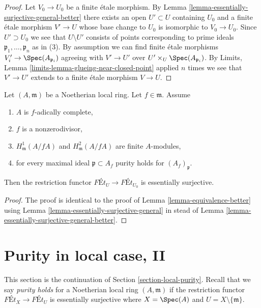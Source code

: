 \begin{proof}
Let $V_0 \to U_0$ be a finite \'etale morphism. By
Lemma \ref{lemma-essentially-surjective-general-better}
there exists an open $U' \subset U$ containing $U_0$ and
a finite \'etale morphism $V' \to U$ whose base change to $U_0$
is isomorphic to $V_0 \to U_0$. Since $U' \supset U_0$
we see that $U \setminus U'$ consists of points corresponding
to prime ideals $\mathfrak p_1, \ldots, \mathfrak p_n$ as in (3).
By assumption we can find finite \'etale morphisms
$V'_i \to \Spec(A_{\mathfrak p_i})$ agreeing with
$V' \to U'$ over $U' \times_U \Spec(A_{\mathfrak p_i})$.
By Limits, Lemma \ref{limits-lemma-glueing-near-closed-point}
applied $n$ times we see that $V' \to U'$ extends to a finite \'etale
morphism $V \to U$.
\end{proof}

\begin{lemma}
\label{lemma-equivalence}
Let $(A, \mathfrak m)$ be a Noetherian local ring.
Let $f \in \mathfrak m$. Assume
\begin{enumerate}
\item $A$ is $f$-adically complete,
\item $f$ is a nonzerodivisor,
\item $H^1_\mathfrak m(A/fA)$ and $H^2_\mathfrak m(A/fA)$ are finite
$A$-modules,
\item for every maximal ideal $\mathfrak p \subset A_f$
purity holds for $(A_f)_\mathfrak p$.
\end{enumerate}
Then the restriction functor $\textit{F\'Et}_U \to \textit{F\'Et}_{U_0}$
is essentially surjective.
\end{lemma}

\begin{proof}
The proof is identical to the proof of
Lemma \ref{lemma-equivalence-better}
using
Lemma \ref{lemma-essentially-surjective-general}
in stead of
Lemma \ref{lemma-essentially-surjective-general-better}.
\end{proof}



\section{Purity in local case, II}
\label{section-local-purity-II}

\noindent
This section is the continuation of Section \ref{section-local-purity}.
Recall that we say {\it purity holds} for a Noetherian local ring
$(A, \mathfrak m)$ if the restriction functor
$\textit{F\'Et}_X \to \textit{F\'Et}_U$ is essentially
surjective where $X = \Spec(A)$ and $U = X \setminus \{\mathfrak m\}$.

